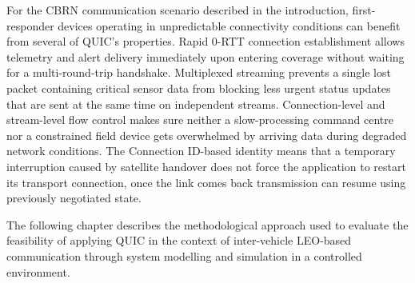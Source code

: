 For the CBRN communication scenario described in the introduction, first-responder devices operating in unpredictable connectivity conditions can benefit from several of QUIC's properties. Rapid 0-RTT connection establishment allows telemetry and alert delivery immediately upon entering coverage without waiting for a multi-round-trip handshake. Multiplexed streaming prevents a single lost packet containing critical sensor data from blocking less urgent status updates that are sent at the same time on independent streams. Connection-level and stream-level flow control makes sure neither a slow-processing command centre nor a constrained field device gets overwhelmed by arriving data during degraded network conditions. The Connection ID-based identity means that a temporary interruption caused by satellite handover does not force the application to restart its transport connection, once the link comes back transmission can resume using previously negotiated state.

The following chapter describes the methodological approach used to evaluate the feasibility of applying QUIC in the context of inter-vehicle LEO-based communication through system modelling and simulation in a controlled environment.

\clearpage
